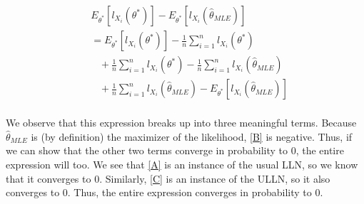 \documentclass[aos,preprint]{imsart}
\numberwithin{equation}{section}
\theoremstyle{plain}
\begin{document}
\begin{align}
	& E_{\theta^*} [l_{X_i} (\theta^*)] - E_{\theta^*} [l_{X_i} (\hat{\theta}_{MLE})] \\
	& = E_{\theta^*} [l_{X_i} (\theta^*)] - \frac{1}{n} \sum_{i=1}^{n} l_{X_i} (\theta^*) \label{A} \\
	& \hspace{10pt} + \frac{1}{n} \sum_{i=1}^{n} l_{X_i} (\theta^*) - \frac{1}{n} \sum_{i=1}^{n} l_{X_i} (\hat{\theta}_{MLE}) \label{B} \\
	& \hspace{10pt} + \frac{1}{n} \sum_{i=1}^{n} l_{X_i} (\hat{\theta}_{MLE}) - E_{\theta^*} [l_{X_i} (\hat{\theta}_{MLE})] \label{C} \\
\end{align}

We observe that this expression breaks up into three meaningful terms. Because $\hat{\theta}_{MLE}$ is (by definition) the maximizer of the likelihood, \ref{B} is negative. Thus, if we can show that the other two terms converge in probability to 0, the entire expression will too. We see that \ref{A} is an instance of the usual LLN, so we know that it converges to 0. Similarly, \ref{C} is an instance of the ULLN, so it also converges to 0. Thus, the entire expression converges in probability to 0.
\end{document}

